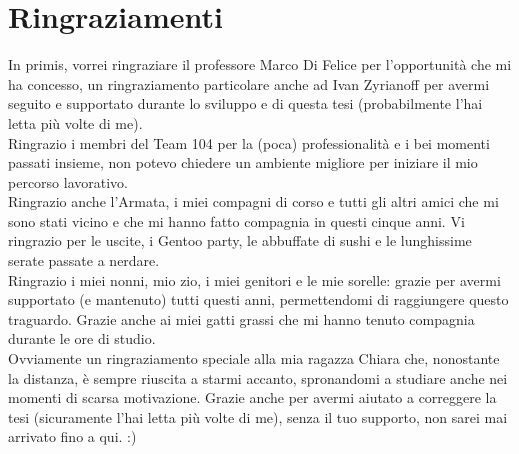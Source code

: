 \myemptypage
\chapter*{Ringraziamenti}

In primis, vorrei ringraziare il professore Marco Di Felice per l'opportunità che mi ha concesso, un ringraziamento particolare anche ad Ivan Zyrianoff per avermi seguito e supportato durante lo sviluppo e di questa tesi (probabilmente l'hai letta più volte di me).\\
Ringrazio i membri del Team 104 per la (poca) professionalità e i bei momenti passati insieme, non potevo chiedere un ambiente migliore per iniziare il mio percorso lavorativo.\\
Ringrazio anche l'Armata, i miei compagni di corso e tutti gli altri amici che mi sono stati vicino e che mi hanno fatto compagnia in questi cinque anni. Vi ringrazio per le uscite, i Gentoo party, le abbuffate di sushi e le lunghissime serate passate a nerdare.\\
Ringrazio i miei nonni, mio zio, i miei genitori e le mie sorelle: grazie per avermi supportato (e mantenuto) tutti questi anni, permettendomi di raggiungere questo traguardo. Grazie anche ai miei gatti grassi che mi hanno tenuto compagnia durante le ore di studio.\\ 
Ovviamente un ringraziamento speciale alla mia ragazza Chiara che, nonostante la distanza, è sempre riuscita a starmi accanto, spronandomi a studiare anche nei momenti di scarsa motivazione. Grazie anche per avermi aiutato a correggere la tesi (sicuramente l'hai letta più volte di me), senza il tuo supporto, non sarei mai arrivato fino a qui. :)
